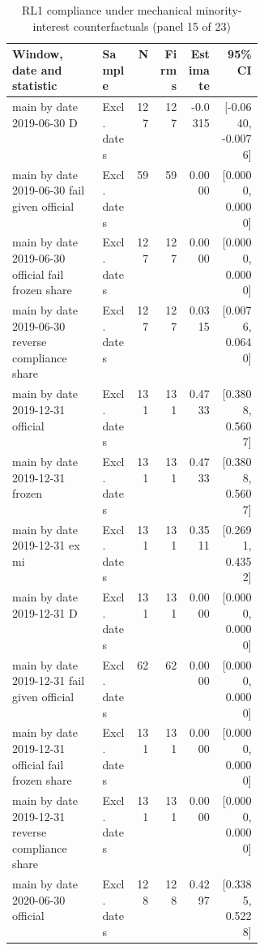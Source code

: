 \begin{table}[!htbp]\centering\scriptsize
\caption{RL1 compliance under mechanical minority-interest counterfactuals (panel 15 of 23)}
\begin{threeparttable}
\begin{tabular}{p{0.36\linewidth}lrrrr}
\toprule
Window, date and statistic & Sample & N & Firms & Estimate & 95\% CI \\
\midrule
main by date 2019-06-30 D & Excl. dates & 127 & 127 & -0.0315 & [-0.0640, -0.0076] \\
main by date 2019-06-30 fail given official & Excl. dates & 59 & 59 & 0.0000 & [0.0000, 0.0000] \\
main by date 2019-06-30 official fail frozen share & Excl. dates & 127 & 127 & 0.0000 & [0.0000, 0.0000] \\
main by date 2019-06-30 reverse compliance share & Excl. dates & 127 & 127 & 0.0315 & [0.0076, 0.0640] \\
main by date 2019-12-31 official & Excl. dates & 131 & 131 & 0.4733 & [0.3808, 0.5607] \\
main by date 2019-12-31 frozen & Excl. dates & 131 & 131 & 0.4733 & [0.3808, 0.5607] \\
main by date 2019-12-31 ex mi & Excl. dates & 131 & 131 & 0.3511 & [0.2691, 0.4352] \\
main by date 2019-12-31 D & Excl. dates & 131 & 131 & 0.0000 & [0.0000, 0.0000] \\
main by date 2019-12-31 fail given official & Excl. dates & 62 & 62 & 0.0000 & [0.0000, 0.0000] \\
main by date 2019-12-31 official fail frozen share & Excl. dates & 131 & 131 & 0.0000 & [0.0000, 0.0000] \\
main by date 2019-12-31 reverse compliance share & Excl. dates & 131 & 131 & 0.0000 & [0.0000, 0.0000] \\
main by date 2020-06-30 official & Excl. dates & 128 & 128 & 0.4297 & [0.3385, 0.5228] \\
\bottomrule
\end{tabular}
\begin{tablenotes}[flushleft]\footnotesize

\end{tablenotes}
\end{threeparttable}
\end{table}
